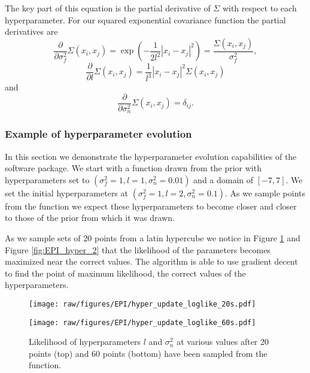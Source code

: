 \documentclass[index]{subfiles}
\begin{document}
The key part of this equation is the partial derivative of $\Sigma$ with respect to each hyperparameter. For our squared exponential covariance function the partial derivatives are
\begin{equation}
    \frac{\partial}{\partial \sigma_{f}^{2}} \Sigma(x_{i}, x_{j}) = \exp\left( -\frac{1}{2l^{2}} |x_{i} - x_{j}|^{2}\right) = \frac{\Sigma(x_{i}, x_{j})}{\sigma_{f}^{2}},
\end{equation}
\begin{equation}
    \frac{\partial}{\partial l} \Sigma(x_{i}, x_{j}) = \frac{1}{l^{3}}|x_{i} - x_{j}|^{2}\Sigma(x_{i}, x_{j})
\end{equation}
and
\begin{equation}
    \frac{\partial}{\partial \sigma_{n}^{2}} \Sigma(x_{i}, x_{j}) = \delta_{ij}.
\end{equation}

\subsubsection{Example of hyperparameter evolution}

In this section we demonstrate the hyperparameter evolution capabilities of the software package. We start with a function drawn from the prior with hyperparameters set to $(\sigma_{f}^{2} = 1, l = 1, \sigma_{n}^{2} = 0.01)$ and a domain of $[-7,7]$. We set the initial hyperparameters at $(\sigma_{f}^{2} = 1, l = 2, \sigma_{n}^{2} = 0.1)$. As we sample points from the function we expect these hyperparameters to become closer and closer to those of the prior from which it was drawn.

As we sample sets of 20 points from a latin hypercube we notice in Figure \ref{fig:EPI_hyper_1} and Figure \ref{fig:EPI_hyper_2} that the likelihood of the parameters becomes maximized near the correct values. The algorithm is able to use gradient decent to find the point of maximum likelihood, the correct values of the hyperparameters.

\begin{figure}[hpt]
 	\centerline{\texttt{[image: raw/figures/EPI/hyper\_update\_loglike\_20s.pdf]}}
    \centerline{\texttt{[image: raw/figures/EPI/hyper\_update\_loglike\_60s.pdf]}}
    \caption[Likelihood of hyperparameters]{Likelihood of hyperparameters $l$ and $\sigma_{n}^{2}$ at various values after 20 points (top) and 60 points (bottom) have been sampled from the function.}
 	\label{fig:EPI_hyper_1}
\end{figure}
\end{document}

